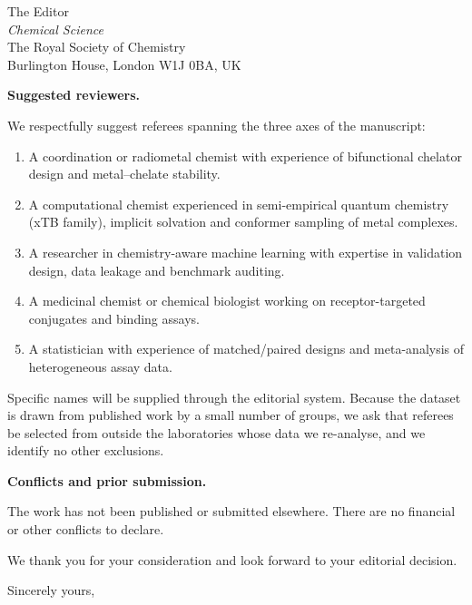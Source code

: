 \documentclass[11pt]{letter}
\providecommand{\paragraph}{}
\renewcommand{\paragraph}[1]{\par\medskip\noindent\textbf{#1}\par\nobreak\smallskip}
\begin{document}
\begin{letter}{The Editor \\
\textit{Chemical Science} \\
The Royal Society of Chemistry \\
Burlington House, London W1J 0BA, UK}
\paragraph{Suggested reviewers.}
We respectfully suggest referees spanning the three axes of the manuscript:
\begin{enumerate}
\item A coordination or radiometal chemist with experience of bifunctional
  chelator design and metal--chelate stability.
\item A computational chemist experienced in semi-empirical quantum chemistry
  (xTB family), implicit solvation and conformer sampling of metal complexes.
\item A researcher in chemistry-aware machine learning with expertise in
  validation design, data leakage and benchmark auditing.
\item A medicinal chemist or chemical biologist working on receptor-targeted
  conjugates and binding assays.
\item A statistician with experience of matched/paired designs and
  meta-analysis of heterogeneous assay data.
\end{enumerate}
Specific names will be supplied through the editorial system. Because the
dataset is drawn from published work by a small number of groups, we ask that
referees be selected from outside the laboratories whose data we re-analyse, and
we identify no other exclusions.

\paragraph{Conflicts and prior submission.}
The work has not been published or submitted elsewhere. There are no financial
or other conflicts to declare.

We thank you for your consideration and look forward to your editorial decision.

\closing{Sincerely yours,}

\end{letter}
\end{document}
